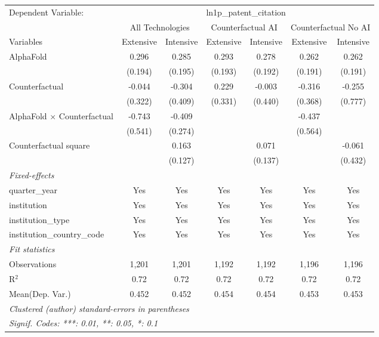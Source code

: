 \begingroup
\centering
\begin{tabular}{lcccccc}
   \tabularnewline \midrule \midrule
   Dependent Variable: & \multicolumn{6}{c}{ln1p\_patent\_citation}\\
 & \multicolumn{2}{c}{All Technologies} & \multicolumn{2}{c}{Counterfactual AI} & \multicolumn{2}{c}{Counterfactual No AI} \\
\cmidrule(lr){1-1}\cmidrule(lr){2-3} \cmidrule(lr){4-5} \cmidrule(lr){6-7}
Variables & \multicolumn{1}{c}{Extensive} & \multicolumn{1}{c}{Intensive} & \multicolumn{1}{c}{Extensive} & \multicolumn{1}{c}{Intensive} & \multicolumn{1}{c}{Extensive} & \multicolumn{1}{c}{Intensive} \\
\cmidrule(lr){1-1}\cmidrule(lr){2-2} \cmidrule(lr){3-3} \cmidrule(lr){4-4} \cmidrule(lr){5-5} \cmidrule(lr){6-6} \cmidrule(lr){7-7}
   AlphaFold                          & 0.296   & 0.285   & 0.293   & 0.278   & 0.262   & 0.262\\   
                                      & (0.194) & (0.195) & (0.193) & (0.192) & (0.191) & (0.191)\\   
   Counterfactual                     & -0.044  & -0.304  & 0.229   & -0.003  & -0.316  & -0.255\\   
                                      & (0.322) & (0.409) & (0.331) & (0.440) & (0.368) & (0.777)\\   
   AlphaFold $\times$ Counterfactual  & -0.743  & -0.409  &         &         & -0.437  &   \\   
                                      & (0.541) & (0.274) &         &         & (0.564) &   \\   
   Counterfactual square              &         & 0.163   &         & 0.071   &         & -0.061\\   
                                      &         & (0.127) &         & (0.137) &         & (0.432)\\   
   \midrule
   \emph{Fixed-effects}\\
   quarter\_year                      & Yes     & Yes     & Yes     & Yes     & Yes     & Yes\\  
   institution                        & Yes     & Yes     & Yes     & Yes     & Yes     & Yes\\  
   institution\_type                  & Yes     & Yes     & Yes     & Yes     & Yes     & Yes\\  
   institution\_country\_code         & Yes     & Yes     & Yes     & Yes     & Yes     & Yes\\  
   \midrule
   \emph{Fit statistics}\\
   Observations                       & 1,201   & 1,201   & 1,192   & 1,192   & 1,196   & 1,196\\  
   R$^2$                              & 0.72    & 0.72    & 0.72    & 0.72    & 0.72    & 0.72\\  
Mean(Dep. Var.) & 0.452 & 0.452 & 0.454 & 0.454 & 0.453 & 0.453 \\
   \midrule \midrule
   \multicolumn{7}{l}{\emph{Clustered (author) standard-errors in parentheses}}\\
   \multicolumn{7}{l}{\emph{Signif. Codes: ***: 0.01, **: 0.05, *: 0.1}}\\
\end{tabular}
\par\endgroup
